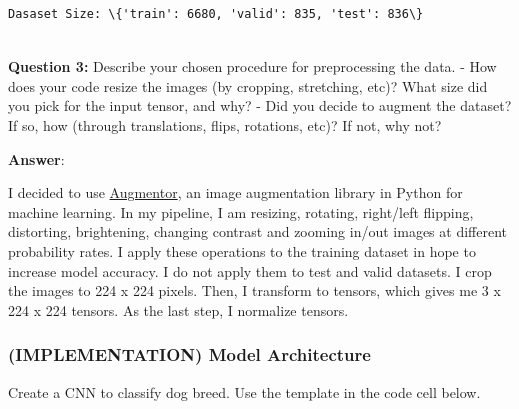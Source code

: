 \documentclass[11pt]{article}
\begin{document}
    \begin{Verbatim}[commandchars=\\\{\}]
Dasaset Size: \{'train': 6680, 'valid': 835, 'test': 836\}


    \end{Verbatim}

    \textbf{Question 3:} Describe your chosen procedure for preprocessing
the data. - How does your code resize the images (by cropping,
stretching, etc)? What size did you pick for the input tensor, and why?
- Did you decide to augment the dataset? If so, how (through
translations, flips, rotations, etc)? If not, why not?

    \textbf{Answer}:

I decided to use
\href{https://github.com/mdbloice/Augmentor}{Augmentor}, an image
augmentation library in Python for machine learning. In my pipeline, I
am resizing, rotating, right/left flipping, distorting, brightening,
changing contrast and zooming in/out images at different probability
rates. I apply these operations to the training dataset in hope to
increase model accuracy. I do not apply them to test and valid datasets.
I crop the images to 224 x 224 pixels. Then, I transform to tensors,
which gives me 3 x 224 x 224 tensors. As the last step, I normalize
tensors.

    \hypertarget{implementation-model-architecture}{%
\subsubsection{(IMPLEMENTATION) Model
Architecture}\label{implementation-model-architecture}}

Create a CNN to classify dog breed. Use the template in the code cell
below.
\end{document}

